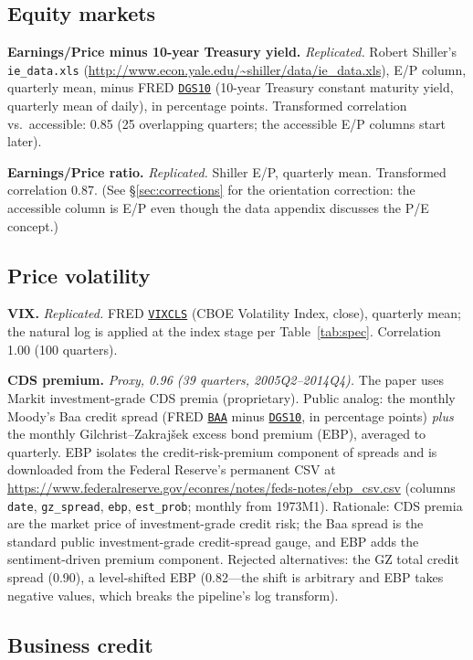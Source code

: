 \documentclass[11pt]{article}
\newcommand{\fred}[1]{\href{https://fred.stlouisfed.org/series/#1}{\texttt{#1}}}
\begin{document}
\subsection{Equity markets}

\textbf{Earnings/Price minus 10-year Treasury yield.}
\textit{Replicated.} Robert Shiller's \texttt{ie\_data.xls}
(\url{http://www.econ.yale.edu/~shiller/data/ie_data.xls}), E/P column,
quarterly mean, minus FRED \fred{DGS10} (10-year Treasury constant
maturity yield, quarterly mean of daily), in percentage points.
Transformed correlation vs.\ accessible: 0.85 (25 overlapping quarters;
the accessible E/P columns start later).

\textbf{Earnings/Price ratio.} \textit{Replicated.} Shiller E/P,
quarterly mean.  Transformed correlation 0.87.  (See
\S\ref{sec:corrections} for the orientation correction: the accessible
column is E/P even though the data appendix discusses the P/E concept.)

\subsection{Price volatility}

\textbf{VIX.} \textit{Replicated.} FRED \fred{VIXCLS} (CBOE Volatility
Index, close), quarterly mean; the natural log is applied at the index
stage per Table~\ref{tab:spec}.  Correlation 1.00 (100 quarters).

\textbf{CDS premium.} \textit{Proxy, 0.96 (39 quarters, 2005Q2--2014Q4).}
The paper uses Markit investment-grade CDS premia (proprietary).  Public
analog: the monthly Moody's Baa credit spread (FRED \fred{BAA} minus
\fred{DGS10}, in percentage points) \textit{plus} the monthly
Gilchrist--Zakraj\v{s}ek excess bond premium (EBP), averaged to
quarterly.  EBP isolates the credit-risk-premium component of spreads
and is downloaded from the Federal Reserve's permanent CSV at
\url{https://www.federalreserve.gov/econres/notes/feds-notes/ebp_csv.csv}
(columns \texttt{date}, \texttt{gz\_spread}, \texttt{ebp},
\texttt{est\_prob}; monthly from 1973M1).  Rationale: CDS premia are the
market price of investment-grade credit risk; the Baa spread is the
standard public investment-grade credit-spread gauge, and EBP adds the
sentiment-driven premium component.  Rejected alternatives: the GZ total
credit spread (0.90), a level-shifted EBP (0.82---the shift is arbitrary
and EBP takes negative values, which breaks the pipeline's log
transform).

\subsection{Business credit}
\end{document}
